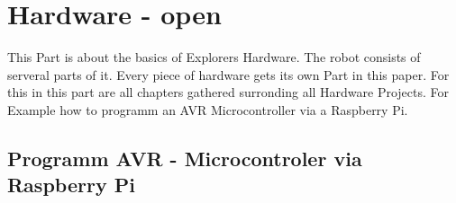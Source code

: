 \part{Hardware - open}
This Part is about the basics of Explorers Hardware. The robot consists of
serveral parts of it. Every piece of hardware gets its own Part in this paper.
For this in this part are all chapters gathered surronding all Hardware
Projects. For Example how to programm an AVR Microcontroller via a Raspberry Pi.
\chapter{Programm AVR - Microcontroler via Raspberry Pi}
